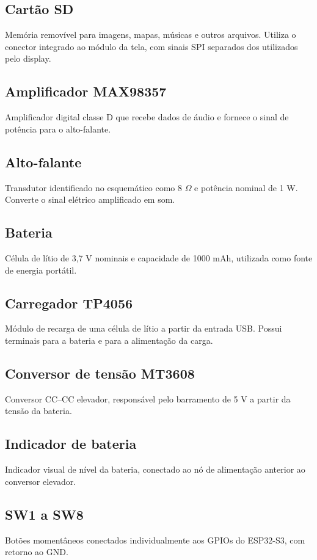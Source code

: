 \documentclass[12pt,a4paper]{article}
\begin{document}
\subsection{Cartão SD}
Memória removível para imagens, mapas, músicas e outros arquivos. Utiliza o conector integrado ao módulo da tela, com sinais SPI separados dos utilizados pelo display.

\subsection{Amplificador MAX98357}
Amplificador digital classe D que recebe dados de áudio e fornece o sinal de potência para o alto-falante.

\subsection{Alto-falante}
Transdutor identificado no esquemático como 8 $\Omega$ e potência nominal de 1 W. Converte o sinal elétrico amplificado em som.

\subsection{Bateria}
Célula de lítio de 3,7 V nominais e capacidade de 1000 mAh, utilizada como fonte de energia portátil.

\subsection{Carregador TP4056}
Módulo de recarga de uma célula de lítio a partir da entrada USB. Possui terminais para a bateria e para a alimentação da carga.

\subsection{Conversor de tensão MT3608}
Conversor CC--CC elevador, responsável pelo barramento de 5 V a partir da tensão da bateria.

\subsection{Indicador de bateria}
Indicador visual de nível da bateria, conectado ao nó de alimentação anterior ao conversor elevador.

\subsection{SW1 a SW8}
Botões momentâneos conectados individualmente aos GPIOs do ESP32-S3, com retorno ao GND.
\end{document}

